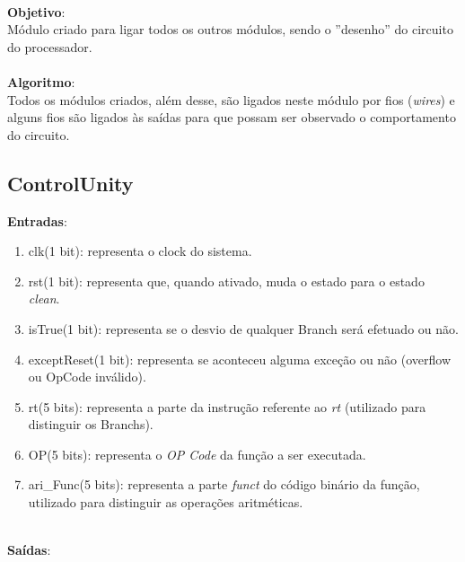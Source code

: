 \documentclass{article}
\begin{document}
\\
    \textbf{Objetivo}:\\
    Módulo criado para ligar todos os outros módulos, sendo o ''desenho'' do circuito do processador.
    \\
    \\
    \textbf{Algoritmo}:\\
    Todos os módulos criados, além desse, são ligados neste módulo por fios ({\it wires}) e alguns fios são ligados às saídas para que possam ser observado o comportamento do circuito.
    
    \newpage
    \subsection{ControlUnity}
    \textbf{Entradas}:
    \begin{enumerate}
         \item clk(1 bit): representa o clock do sistema.
         \item rst(1 bit): representa que, quando ativado, muda o estado para o estado {\it clean}.
         \item isTrue(1 bit): representa se o desvio de qualquer Branch será efetuado ou não.
         \item exceptReset(1 bit): representa se aconteceu alguma exceção ou não (overflow ou OpCode inválido).
         \item rt(5 bits): representa a parte da instrução referente ao {\it rt} (utilizado para distinguir os Branchs).
         \item OP(5 bits): representa o {\it OP Code} da função a ser executada.
         \item ari\_Func(5 bits): representa a parte {\it funct} do código binário da função, utilizado para distinguir as operações aritméticas.\\
    \end{enumerate}
\\
    \textbf{Saídas}:
\end{document}
